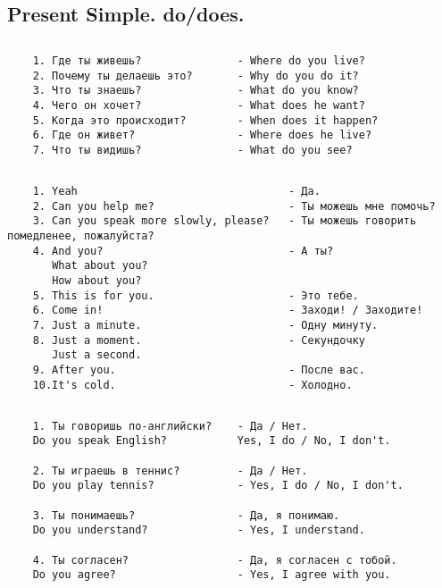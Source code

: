 \subsection{Present Simple. do/does.}
\subsection*{}
\begin{verbatim}
    1. Где ты живешь?               - Where do you live?
    2. Почему ты делаешь это?       - Why do you do it?
    3. Что ты знаешь?               - What do you know?
    4. Чего он хочет?               - What does he want?
    5. Когда это происходит?        - When does it happen?
    6. Где он живет?                - Where does he live?
    7. Что ты видишь?               - What do you see?
\end{verbatim}

\subsection*{}
\begin{verbatim}
    1. Yeah                                 - Да.
    2. Can you help me?                     - Ты можешь мне помочь?
    3. Can you speak more slowly, please?   - Ты можешь говорить помедленее, пожалуйста?
    4. And you?                             - А ты?
       What about you?
       How about you?
    5. This is for you.                     - Это тебе.
    6. Come in!                             - Заходи! / Заходите!
    7. Just a minute.                       - Одну минуту.
    8. Just a moment.                       - Секундочку
       Just a second.
    9. After you.                           - После вас.
    10.It's cold.                           - Холодно.
\end{verbatim}

\subsection*{}
\begin{verbatim}
    1. Ты говоришь по-английски?    - Да / Нет.
    Do you speak English?           Yes, I do / No, I don't.

    2. Ты играешь в теннис?         - Да / Нет.
    Do you play tennis?             - Yes, I do / No, I don't.

    3. Ты понимаешь?                - Да, я понимаю.
    Do you understand?              - Yes, I understand.

    4. Ты согласен?                 - Да, я согласен с тобой.
    Do you agree?                   - Yes, I agree with you.
\end{verbatim}

